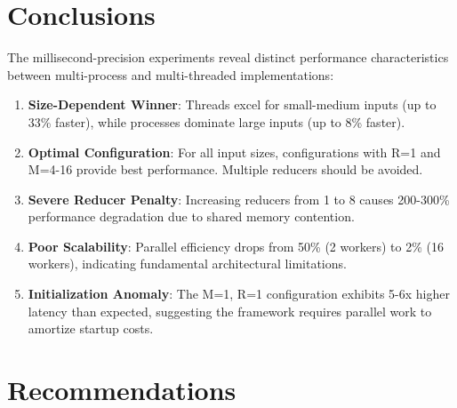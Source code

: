 \documentclass[11pt]{article}
\begin{document}
\section{Conclusions}

The millisecond-precision experiments reveal distinct performance characteristics between multi-process and multi-threaded implementations:

\begin{enumerate}
    \item \textbf{Size-Dependent Winner}: Threads excel for small-medium inputs (up to 33\% faster), while processes dominate large inputs (up to 8\% faster).
    
    \item \textbf{Optimal Configuration}: For all input sizes, configurations with R=1 and M=4-16 provide best performance. Multiple reducers should be avoided.
    
    \item \textbf{Severe Reducer Penalty}: Increasing reducers from 1 to 8 causes 200-300\% performance degradation due to shared memory contention.
    
    \item \textbf{Poor Scalability}: Parallel efficiency drops from 50\% (2 workers) to 2\% (16 workers), indicating fundamental architectural limitations.
    
    \item \textbf{Initialization Anomaly}: The M=1, R=1 configuration exhibits 5-6x higher latency than expected, suggesting the framework requires parallel work to amortize startup costs.
\end{enumerate}

\section{Recommendations}
\end{document}
